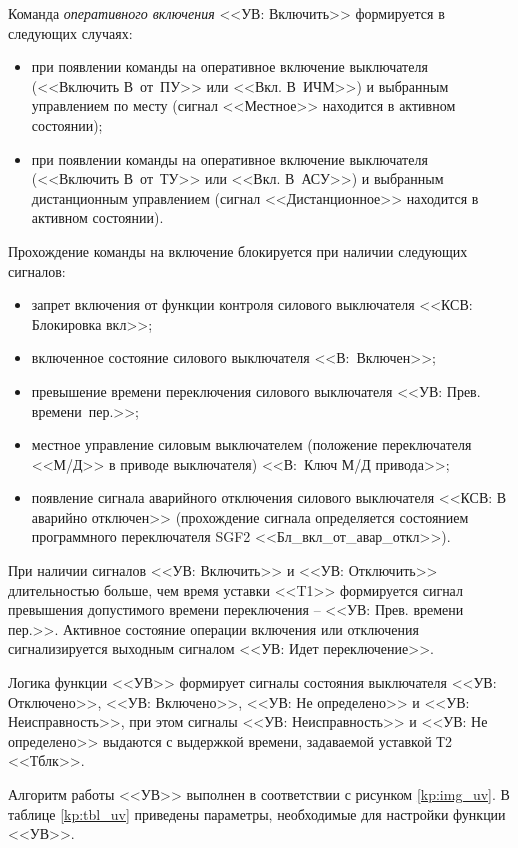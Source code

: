 \par
Команда \emph{оперативного включения} <<УВ: Включить>> формируется в следующих случаях:
\begin{itemize}
	\item при появлении команды на оперативное включение выключателя (<<Включить В~от~ПУ>> или <<Вкл. В~ИЧМ>>) и выбранным управлением по месту (сигнал <<Местное>> находится в активном состоянии);
	\item при появлении команды на оперативное включение выключателя (<<Включить В~от~ТУ>> или <<Вкл. В~АСУ>>) и выбранным дистанционным управлением (сигнал <<Дистанционное>> находится в активном состоянии).
\end{itemize}
Прохождение команды на включение блокируется при наличии следующих сигналов:
\begin{itemize}
	\item запрет включения от функции контроля силового выключателя <<КСВ: Блокировка вкл>>;
	\item включенное состояние силового выключателя <<В:~Включен>>;
	\item превышение времени переключения силового выключателя <<УВ: Прев. времени~пер.>>;
	\item местное управление силовым выключателем (положение переключателя <<М/Д>> в приводе выключателя) <<В:~Ключ М/Д привода>>;
	\item появление сигнала аварийного отключения силового выключателя <<КСВ: В аварийно отключен>> (прохождение сигнала определяется состоянием программного переключателя SGF2 <<Бл\_вкл\_от\_авар\_откл>>).
\end{itemize}

\par
При наличии сигналов <<УВ: Включить>> и <<УВ: Отключить>> длительностью больше, чем время уставки <<T1>> формируется сигнал превышения допустимого времени переключения -- <<УВ: Прев. времени пер.>>. Активное состояние операции включения или отключения сигнализируется выходным сигналом <<УВ: Идет переключение>>.

\par
Логика функции <<УВ>> формирует сигналы состояния выключателя <<УВ: Отключено>>, <<УВ: Включено>>, <<УВ: Не определено>> и <<УВ: Неисправность>>, при этом сигналы <<УВ: Неисправность>> и <<УВ: Не определено>> выдаются с выдержкой времени, задаваемой уставкой Т2 <<Тблк>>.

\par
Алгоритм работы <<УВ>> выполнен в соответствии с рисунком \ref{kp:img_uv}. В таблице \ref{kp:tbl_uv} приведены параметры, необходимые для настройки функции <<УВ>>.

